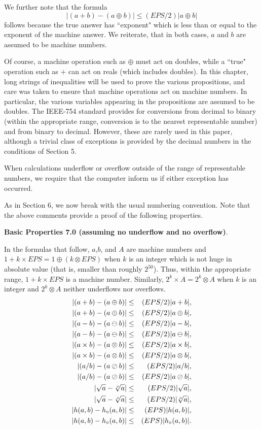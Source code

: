 We further note that the formula 
$$|(a + b) - (a \oplus b)| \leq (EPS/2) |a \oplus b|$$
follows because the true answer has ``exponent" which is less than or equal to the exponent of the machine answer.  We reiterate, that in both cases, $a$ and $b$ are assumed to be machine numbers.

Of course, a machine operation such as $\oplus$ must act on doubles, while a ``true" operation such as $+$ can act on reals (which includes doubles).  In this chapter, long strings of inequalities will be used to prove the various propositions, and care was taken to ensure that machine operations act on machine numbers.  In particular, the various variables appearing in the propositions are assumed to be doubles. The IEEE-754 standard provides for conversions from decimal to binary (within the appropriate range, conversion is to the nearest representable number) and from binary to decimal.  However, these are rarely used in this paper, although a trivial class of exceptions is provided by the decimal numbers in the conditions of
Section 5.

When calculations underflow or overflow outside of the range of representable numbers, we require that the computer inform us if either exception has occurred.  

As in Section 6, we now break with the usual numbering convention.  Note that the above comments provide a proof of the
following properties.

 {\bf Basic Properties 7.0 (assuming no underflow and no overflow)}.

In the formulas that follow, $a$,$b$, and $A$ are machine numbers and
$1 + k \times EPS = 1 \oplus (k \otimes EPS)$ when $k$ is an integer which is not huge in absolute value (that is, 
smaller than roughly $2^{50}$).  Thus, within the appropriate range,  $1 + k \times EPS$ is a machine number.  Similarly,
$2^k
\times A = 2^k \otimes A$ when $k$ is an integer and  $2^k \otimes A$ neither underflows nor overflows.
\begin{eqnarray*}
|(a + b) - (a \oplus b)| &\leq& (EPS/2) |a + b|,\\
|(a + b) - (a \oplus b)|&\leq& (EPS/2) |a \oplus b|,\\
|(a - b) - (a \ominus b)| &\leq& (EPS/2) |a - b|,\\
|(a - b) - (a \ominus b)|&\leq& (EPS/2) |a \ominus b|,\\
|(a \times b) - (a \otimes b)| &\leq& (EPS/2) |a \times b|,\\
|(a \times b) - (a \otimes b)| &\leq&(EPS/2) |a \otimes b|,\\
|(a / b) - (a \oslash b)| &\leq& (EPS/2) |a / b|,\\
|(a / b) - (a \oslash b)| &\leq& (EPS/2) |a \oslash b|,\\
|\sqrt a - \root o \of a| &\leq& (EPS/2) |\sqrt a|,\\
|\sqrt a - \root o \of a|  &\leq&  (EPS/2) |\root o \of a|,\\
|h(a,b) - h_\circ(a,b)| &\leq& (EPS) |h(a,b)|,\\
|h(a,b) - h_\circ(a,b)| &\leq&   (EPS) |h_\circ(a,b)|.
\end{eqnarray*}

